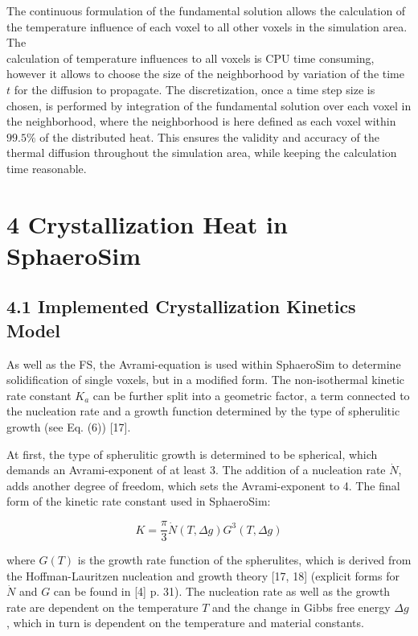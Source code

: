 \documentclass[10pt]{article}
\begin{document}
The continuous formulation of the fundamental solution allows the calculation of the temperature influence of each voxel to all other voxels in the simulation area. The\\
calculation of temperature influences to all voxels is CPU time consuming, however it allows to choose the size of the neighborhood by variation of the time $t$ for the diffusion to propagate. The discretization, once a time step size is chosen, is performed by integration of the fundamental solution over each voxel in the neighborhood, where the neighborhood is here defined as each voxel within $99.5 \%$ of the distributed heat. This ensures the validity and accuracy of the thermal diffusion throughout the simulation area, while keeping the calculation time reasonable.

\section*{4 Crystallization Heat in SphaeroSim}
\subsection*{4.1 Implemented Crystallization Kinetics Model}
As well as the FS, the Avrami-equation is used within SphaeroSim to determine solidification of single voxels, but in a modified form. The non-isothermal kinetic rate constant $K_{a}$ can be further split into a geometric factor, a term connected to the nucleation rate and a growth function determined by the type of spherulitic growth (see Eq. (6)) [17].

At first, the type of spherulitic growth is determined to be spherical, which demands an Avrami-exponent of at least 3. The addition of a nucleation rate $\dot{N}$, adds another degree of freedom, which sets the Avrami-exponent to 4. The final form of the kinetic rate constant used in SphaeroSim:


\begin{equation*}
K=\frac{\pi}{3} \dot{N}(T, \Delta g) G^{3}(T, \Delta g) \tag{6}
\end{equation*}


where $G(T)$ is the growth rate function of the spherulites, which is derived from the Hoffman-Lauritzen nucleation and growth theory [17, 18] (explicit forms for $\dot{N}$ and $G$ can be found in [4] p. 31). The nucleation rate as well as the growth rate are dependent on the temperature $T$ and the change in Gibbs free energy $\Delta g$, which in turn is dependent on the temperature and material constants.
\end{document}
